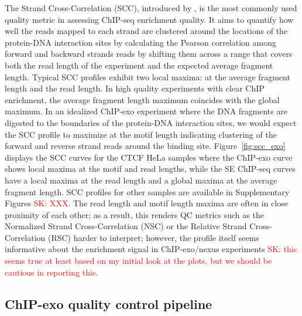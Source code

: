 \documentclass{bmcart}
\newcommand{\SK}[1]{\textcolor{red}{SK: #1}}
\begin{document}
The Strand Cross-Correlation (SCC), introduced by \cite{strandcc}, is the most commonly used quality metric in assessing 
ChIP-seq enrichment quality. It aims to quantify  how well the reads mapped to each
strand are clustered around the locations of the protein-DNA interaction sites by calculating the Pearson correlation among forward and backward strands reads by shifting them across a range that covers both the read length of the experiment and the expected average fragment length.
Typical SCC profiles exhibit two local maxima: at the average fragment length and the read length. In high quality experiments with clear ChIP enrichment, the average fragment length maximum coincides with the global maximum.
In an
idealized ChIP-exo experiment where the DNA fragments are digested
 to  the boundaries of the protein-DNA interaction sites,  we would expect the SCC profile to maximize at the motif length indicating clustering of the forward and reverse strand reads around the  binding site.
 Figure~\ref{fig:scc_exo} displays the SCC curves for the CTCF  HeLa samples where the ChIP-exo curve shows  local maxima at the motif and read
lengths, while the SE ChIP-seq curves have a local maxima at the read
length and a global maxima at the average fragment
length. SCC profiles for other samples  are available in Supplementary Figures \SK{XXX}. The read length and motif length maxima are often in close proximity of each other; as a result, this renders
QC metrics such as the Normalized
Strand Cross-Correlation (NSC) or the Relative Strand
Cross-Correlation (RSC) harder to interpret; however, the profile itself seems informative about the enrichment signal in ChIP-exo/nexus experiments \SK{this seems true at least based on my initial look at the plots, but we should be cautious in reporting this}.

\subsection*{ChIP-exo quality control pipeline}
\end{document}
